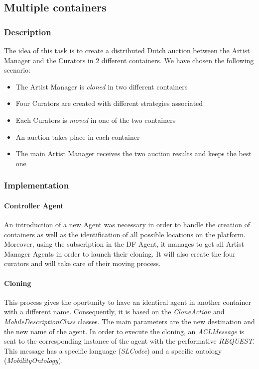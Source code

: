 \documentclass[a4paper,11pt]{article}
\begin{document}

  \subsection{Multiple containers}

  \subsubsection{Description}

  The idea of this task is to create a distributed Dutch auction between the Artist Manager
  and the Curators in 2 different containers.
  We have chosen the following scenario:
  \begin{itemize}
  \item The Artist Manager is \textit{cloned} in two different containers
  \item Four Curators are created with different strategies associated
  \item Each Curators is \textit{moved} in one of the two containers 
  \item An auction takes place in each container
  \item The main Artist Manager receives the two auction results and keeps the best one
  \end{itemize}

  \subsubsection{Implementation}

  \paragraph{Controller Agent}

  An introduction of a new Agent was necessary in order to handle the creation of containers
  as well as the identification of all possible locations on the platform. Moreover, using the
  subscription in the DF Agent, it manages to get all Artist Manager Agents in order to
  launch their cloning. It will also create the four curators and will take care of their
  moving process.

  \paragraph{Cloning}

  This process gives the oportunity to have an identical agent in another container with a different
  name. Consequently, it is based on the \textit{CloneAction} and \textit{MobileDescriptionClass} classes.
  The main parameters are the new destination and the new name of the agent.
  In order to execute the cloning, an \textit{ACLMessage} is sent to the corresponding instance of the agent
  with the performative \textit{REQUEST}. This message has a specific language (\textit{SLCodec}) and a specific
  ontology (\textit{MobilityOntology}).
\end{document}
